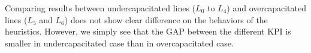 Comparing results between undercapacitated lines ($L_0$ to $L_4$) and overcapacitated lines ($L_5$ and $L_6$) does not show clear difference on the behaviors of the heuristics.
However, we simply see that the GAP between the different KPI is smaller in undercapacitated case than in overcapacitated case.










